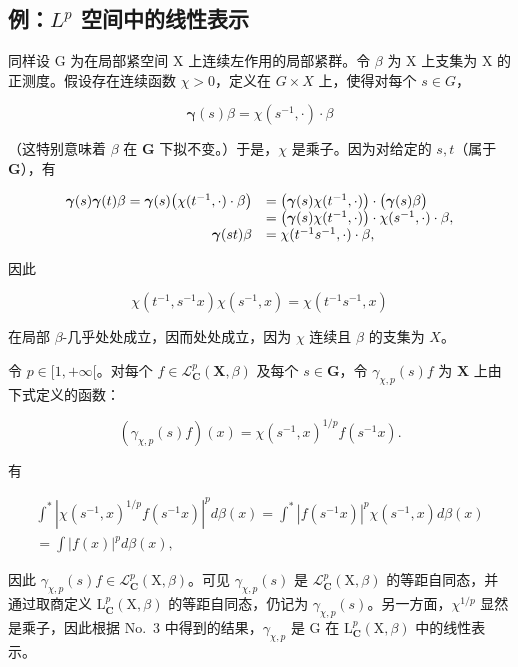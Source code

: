 \subsection{\texorpdfstring{例：\(L^{p}\) 空间中的线性表示}{例：L\^{}\{p\} 空间中的线性表示}}

同样设 G 为在局部紧空间 X 上连续左作用的局部紧群。令 \(\beta\) 为 X 上支集为 X 的正测度。假设存在连续函数 \(\chi > 0\)，定义在 \(G \times X\) 上，使得对每个 \(s \in G\)，

\[
\boldsymbol {\gamma} (s) \beta = \chi (s ^ {- 1}, \cdot) \cdot \beta
\]

（这特别意味着 \(\beta\) 在 \(\mathbf{G}\) 下拟不变。）于是，\(\chi\) 是乘子。因为对给定的 \(s, t\)（属于 \(\mathbf{G}\)），有

\[
\begin{array}{r l} \boldsymbol {\gamma} (s) \boldsymbol {\gamma} (t) \beta = \boldsymbol {\gamma} (s) \big (\chi (t ^ {- 1}, \cdot) \cdot \beta \big) & = \big (\boldsymbol {\gamma} (s) \chi (t ^ {- 1}, \cdot) \big) \cdot \big (\boldsymbol {\gamma} (s) \beta \big) \\ & = \big (\boldsymbol {\gamma} (s) \chi (t ^ {- 1}, \cdot) \big) \cdot \chi (s ^ {- 1}, \cdot) \cdot \beta , \\ \boldsymbol {\gamma} (s t) \beta & = \chi (t ^ {- 1} s ^ {- 1}, \cdot) \cdot \beta , \end{array}
\]

因此

\[
\chi (t ^ {- 1}, s ^ {- 1} x) \chi (s ^ {- 1}, x) = \chi (t ^ {- 1} s ^ {- 1}, x)
\]

在局部 \(\beta\)-几乎处处成立，因而处处成立，因为 \(\chi\) 连续且 \(\beta\) 的支集为 \(X\)。

令 \(p \in [1, +\infty[\)。对每个 \(f \in \mathcal{L}_{\mathbf{C}}^{p}(\mathbf{X}, \beta)\) 及每个 \(s \in \mathbf{G}\)，令 \(\gamma_{\chi,p}(s)f\) 为 \(\mathbf{X}\) 上由下式定义的函数：

\[
\left(\gamma_ {\chi , p} (s) f\right) (x) = \chi (s ^ {- 1}, x) ^ {1 / p} f (s ^ {- 1} x).
\]

有

\[
\begin{array}{c} \int^ {*} | \chi (s ^ {- 1}, x) ^ {1 / p} f (s ^ {- 1} x) | ^ {p} d \beta (x) = \int^ {*} | f (s ^ {- 1} x) | ^ {p} \chi (s ^ {- 1}, x) d \beta (x) \\ = \int | f (x) | ^ {p} d \beta (x), \end{array}
\]

因此 \(\gamma_{\chi,p}(s)f\in\mathcal{L}_{\mathbf{C}}^{p}(\mathrm{X},\beta)\)。可见 \(\gamma_{\chi,p}(s)\) 是 \(\mathcal{L}_{\mathbf{C}}^{p}(\mathrm{X},\beta)\) 的等距自同态，并通过取商定义 \(\mathrm{L}_{\mathbf{C}}^{p}(\mathrm{X},\beta)\) 的等距自同态，仍记为 \(\gamma_{\chi,p}(s)\)。另一方面，\(\chi^{1/p}\) 显然是乘子，因此根据 No.~3 中得到的结果，\(\gamma_{\chi,p}\) 是 G 在 \(\mathrm{L}_{\mathbf{C}}^{p}(\mathrm{X},\beta)\) 中的线性表示。

